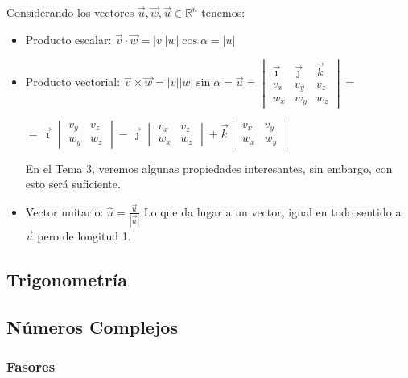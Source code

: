 \vspace{0.5cm}
Considerando los vectores \( \vec{u},\vec{w}, \vec{u} \in \mathbb{R}^n\) tenemos:


\vspace{0.3cm}
\begin{itemize}
        \item Producto escalar: \( \vec{v}\cdot \vec{w} = \left\lvert v\right\rvert \left\lvert w\right\rvert \cos{\alpha } = \left\lvert u\right\rvert \)


        \item Producto vectorial: \(\vec{v}\times  \vec{w} = \left\lvert v\right\rvert \left\lvert w\right\rvert \sin{\alpha } = \vec{u} = \begin{vmatrix}
                      \vec{\imath} & \vec{\jmath} & \vec{k} \\
                      v_x          & v_y          & v_z     \\
                      w_x          & w_y          & w_z
              \end{vmatrix} =\) \par \hspace{1.5cm} \( = \vec{\imath}
              \begin{vmatrix}
                      v_y & v_z \\
                      w_y & w_z
              \end{vmatrix}
              -\vec{\jmath} \begin{vmatrix}
                      v_x & v_z \\
                      w_x & w_z
              \end{vmatrix}
              + \vec{k} \begin{vmatrix}
                      v_x & v_y \\
                      w_x & w_y
              \end{vmatrix}
              \) \par
              En el Tema 3, veremos algunas propiedades interesantes, sin embargo, con esto será suficiente.
        \item Vector unitario: \( \hat{u} = \frac{\vec{u}}{\left | \vec{u} \right |}\) Lo que da lugar a un vector, igual en todo sentido a \(\vec{u}\) pero de longitud 1.
\end{itemize}
\subsection{Trigonometría}
\subsection{Números Complejos}
\subsubsection{Fasores}
